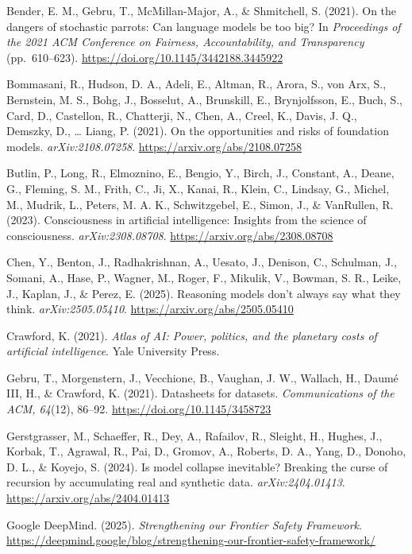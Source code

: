 \documentclass[
  11pt,
]{article}
\begin{document}
Bender, E. M., Gebru, T., McMillan-Major, A., \& Shmitchell, S. (2021).
On the dangers of stochastic parrots: Can language models be too big? In
\emph{Proceedings of the 2021 ACM Conference on Fairness,
Accountability, and Transparency} (pp.~610--623).
\url{https://doi.org/10.1145/3442188.3445922}

Bommasani, R., Hudson, D. A., Adeli, E., Altman, R., Arora, S., von Arx,
S., Bernstein, M. S., Bohg, J., Bosselut, A., Brunskill, E.,
Brynjolfsson, E., Buch, S., Card, D., Castellon, R., Chatterji, N.,
Chen, A., Creel, K., Davis, J. Q., Demszky, D., \ldots{} Liang, P.
(2021). On the opportunities and risks of foundation models.
\emph{arXiv:2108.07258}. \url{https://arxiv.org/abs/2108.07258}

Butlin, P., Long, R., Elmoznino, E., Bengio, Y., Birch, J., Constant,
A., Deane, G., Fleming, S. M., Frith, C., Ji, X., Kanai, R., Klein, C.,
Lindsay, G., Michel, M., Mudrik, L., Peters, M. A. K., Schwitzgebel, E.,
Simon, J., \& VanRullen, R. (2023). Consciousness in artificial
intelligence: Insights from the science of consciousness.
\emph{arXiv:2308.08708}. \url{https://arxiv.org/abs/2308.08708}

Chen, Y., Benton, J., Radhakrishnan, A., Uesato, J., Denison, C.,
Schulman, J., Somani, A., Hase, P., Wagner, M., Roger, F., Mikulik, V.,
Bowman, S. R., Leike, J., Kaplan, J., \& Perez, E. (2025). Reasoning
models don't always say what they think. \emph{arXiv:2505.05410}.
\url{https://arxiv.org/abs/2505.05410}

Crawford, K. (2021). \emph{Atlas of AI: Power, politics, and the
planetary costs of artificial intelligence}. Yale University Press.

Gebru, T., Morgenstern, J., Vecchione, B., Vaughan, J. W., Wallach, H.,
Daumé III, H., \& Crawford, K. (2021). Datasheets for datasets.
\emph{Communications of the ACM, 64}(12), 86--92.
\url{https://doi.org/10.1145/3458723}

Gerstgrasser, M., Schaeffer, R., Dey, A., Rafailov, R., Sleight, H.,
Hughes, J., Korbak, T., Agrawal, R., Pai, D., Gromov, A., Roberts, D.
A., Yang, D., Donoho, D. L., \& Koyejo, S. (2024). Is model collapse
inevitable? Breaking the curse of recursion by accumulating real and
synthetic data. \emph{arXiv:2404.01413}.
\url{https://arxiv.org/abs/2404.01413}

Google DeepMind. (2025). \emph{Strengthening our Frontier Safety
Framework}.
\url{https://deepmind.google/blog/strengthening-our-frontier-safety-framework/}
\end{document}
